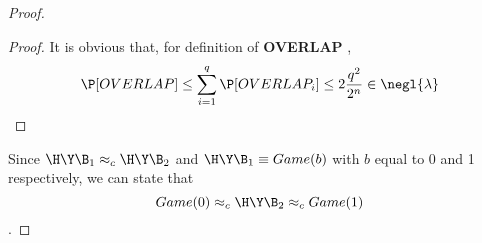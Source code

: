 \begin{proof}
\begin{proof}
It is obvious that, for definition of \textbf{OVERLAP} , 
\[
    \P [ OVERLAP ] \leq \sum_{i=1}^{q} \P [ OVERLAP_{i} ] \leq 2
    \frac{q^{2}}{2^{n}} \in \negl{\lambda}  
\]


    \end{proof}
    
    Since $\H\Y\B_{1} \approx_{c} \H\Y\B_{2}$ and $\H\Y\B_{1}\equiv Game(b)$
    with $b$ equal to 0 and 1 respectively, we can state that 
    \[
        Game(0) \approx_{c} \H\Y\B_{2} \approx_{c} Game(1)
    \]
    .
    
\end{proof}

